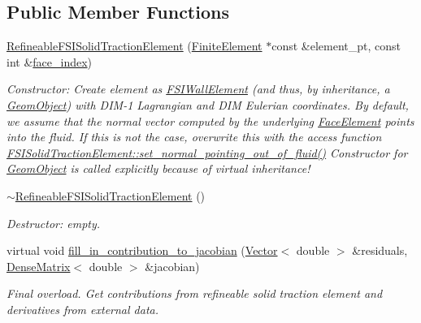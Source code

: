 \subsection*{Public Member Functions}
\begin{DoxyCompactItemize}
\item 
\hyperlink{classoomph_1_1RefineableFSISolidTractionElement_aa3b729e477187807b8ade53d64200e22}{Refineable\+F\+S\+I\+Solid\+Traction\+Element} (\hyperlink{classoomph_1_1FiniteElement}{Finite\+Element} $\ast$const \&element\+\_\+pt, const int \&\hyperlink{classoomph_1_1FaceElement_a478d577ac6db67ecc80f1f02ae3ab170}{face\+\_\+index})
\begin{DoxyCompactList}\small\item\em Constructor\+: Create element as \hyperlink{classoomph_1_1FSIWallElement}{F\+S\+I\+Wall\+Element} (and thus, by inheritance, a \hyperlink{classoomph_1_1GeomObject}{Geom\+Object}) with D\+I\+M-\/1 Lagrangian and D\+IM Eulerian coordinates. By default, we assume that the normal vector computed by the underlying \hyperlink{classoomph_1_1FaceElement}{Face\+Element} points into the fluid. If this is not the case, overwrite this with the access function \hyperlink{classoomph_1_1FSISolidTractionElement_aaa745c32fe53e76ac0b9d1b00a05fe36}{F\+S\+I\+Solid\+Traction\+Element\+::set\+\_\+normal\+\_\+pointing\+\_\+out\+\_\+of\+\_\+fluid()} Constructor for \hyperlink{classoomph_1_1GeomObject}{Geom\+Object} is called explicitly because of virtual inheritance! \end{DoxyCompactList}\item 
\hyperlink{classoomph_1_1RefineableFSISolidTractionElement_a93dba5ec7c731196a4963734543c9395}{$\sim$\+Refineable\+F\+S\+I\+Solid\+Traction\+Element} ()
\begin{DoxyCompactList}\small\item\em Destructor\+: empty. \end{DoxyCompactList}\item 
virtual void \hyperlink{classoomph_1_1RefineableFSISolidTractionElement_a886a6bcb5722c9535f6f78ccefdc0646}{fill\+\_\+in\+\_\+contribution\+\_\+to\+\_\+jacobian} (\hyperlink{classoomph_1_1Vector}{Vector}$<$ double $>$ \&residuals, \hyperlink{classoomph_1_1DenseMatrix}{Dense\+Matrix}$<$ double $>$ \&jacobian)
\begin{DoxyCompactList}\small\item\em Final overload. Get contributions from refineable solid traction element and derivatives from external data. \end{DoxyCompactList}\end{DoxyCompactItemize}
